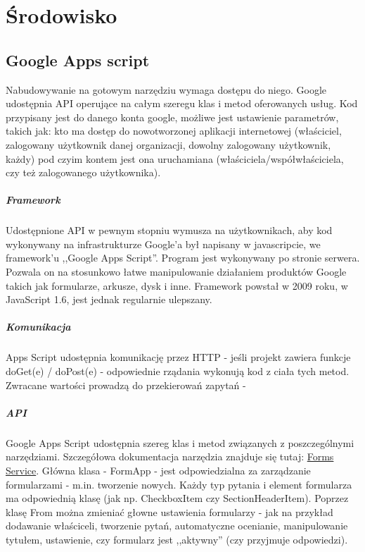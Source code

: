 \chapter{Środowisko}
\section{Google Apps script}
Nabudowywanie na gotowym narzędziu wymaga dostępu do niego. Google udostępnia API operujące na całym szeregu klas i metod oferowanych usług. Kod przypisany jest do danego konta google, możliwe jest ustawienie parametrów,  takich  jak: kto ma dostęp do nowotworzonej aplikacji internetowej (właściciel, zalogowany użytkownik danej organizacji, dowolny zalogowany użytkownik, każdy) pod czyim kontem jest ona uruchamiana (właściciela/współwłaściciela, czy też zalogowanego użytkownika). 

\paragraph{Framework}
Udostępnione API w pewnym stopniu wymusza na użytkownikach, aby kod wykonywany na infrastrukturze Google'a był napisany w javascripcie, we framework'u ,,Google Apps Script''. Program jest wykonywany po stronie serwera. Pozwala on na stosunkowo łatwe manipulowanie działaniem produktów Google takich jak formularze, arkusze, dysk i inne. 
\ind Framework powstał w 2009 roku, w JavaScript 1.6, jest jednak regularnie ulepszany.

\paragraph{Komunikacja}
 Apps Script udostępnia komunikację przez HTTP - jeśli projekt zawiera funkcje doGet(e){} / doPost(e){} - odpowiednie rządania wykonują kod z ciała tych metod. Zwracane wartości prowadzą do przekierowań zapytań  - %
\paragraph{API}
Google Apps Script udostępnia szereg klas i metod związanych z poszczególnymi narzędziami. Szczegółowa dokumentacja narzędzia znajduje się tutaj: \href{https://developers.google.com/apps-script/reference/forms}{Forms Service}.
 Główna klasa - FormApp - jest odpowiedzialna za zarządzanie formularzami - m.in. tworzenie nowych. Każdy typ pytania i element formularza ma odpowiednią klasę (jak np. CheckboxItem czy SectionHeaderItem). Poprzez klasę From  można zmieniać głowne ustawienia formularzy  - jak na przykład dodawanie właściceli, tworzenie pytań, automatyczne ocenianie, manipulowanie tytułem, ustawienie, czy formularz jest ,,aktywny'' (czy przyjmuje odpowiedzi).
